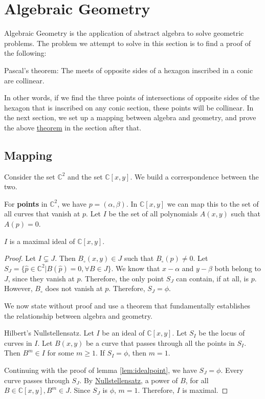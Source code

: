 \section{Algebraic Geometry}
Algebraic Geometry is the application of abstract algebra to solve geometric problems.
The problem we attempt to solve in this section is to find a proof of the following:
\begin{theorem} \label{theorem:pascals}
  Pascal's theorem: The meets of opposite sides of a hexagon inscribed in a conic are collinear.
\end{theorem}
In other words, if we find the three points of intersections of opposite sides of the hexagon that is inscribed on any conic section, these points will be collinear.
In the next section, we set up a mapping between algebra and geometry, and prove the above \hyperref[theorem:pascals]{theorem} in the section after that.

\subsection{Mapping}
Consider the set $\mathbb{C}^{2}$ and the set $\mathbb{C}[x, y]$.
We build a correspondence between the two.
\par
For \textbf{points} in $\mathbb{C}^{2}$, we have $p = ( \alpha, \beta )$.
In $\mathbb{C}[x, y]$ we can map this to the set of all curves that vanish at $p$.
Let $I$ be the set of all polynomials $A(x, y)$ such that $A(p) = 0$.
\begin{lemma} \label{lem:idealpoint}
  $I$ is a maximal ideal of $\mathbb{C}[x, y]$.
\end{lemma}
\begin{proof} \label{proof:idealpoint}
  Let $I \subsetneq J$.
  Then $B_{\circ}(x, y) \in J$ such that $B_{\circ}(p) \neq 0$.
  Let $S_{J} = \{ \widehat{p} \in \mathbb{C}^{2} | B(\widehat{p}) = 0, \forall B \in J \}$.
  We know that $x - \alpha$ and $y - \beta$ both belong to $J$, since they vanish at $p$.
  Therefore, the only point $S_{J}$ can contain, if at all, is $p$.
  However, $B_{\circ}$ does not vanish at $p$.
  Therefore, $S_{J} = \phi$.
  \par
  We now state without proof and use a theorem that fundamentally establishes the relationship between algebra and geometry.
  \par
  \begin{theorem} \label{theorem:nullstellensatz}
    Hilbert's Nullstellensatz.
    Let $I$ be an ideal of $\mathbb{C}[x, y]$.
    Let $S_{I}$ be the locus of curves in $I$.
    Let $B(x, y)$ be a curve that passes through all the points in $S_{I}$.
    Then $B^{m} \in I$ for some $m \geq 1$.
    If $S_{I} = \phi$, then $m = 1$.
  \end{theorem}
  Continuing with the proof of lemma \ref{lem:idealpoint}, we have $S_{J} = \phi$.
  Every curve passes through $S_{J}$.
  By \hyperref[theorem:nullstellensatz]{Nullstellensatz}, a power of $B$, for all $B \in \mathbb{C}[x ,y], B^{m} \in J$.
  Since $S_{J}$ is $\phi$, $m = 1$.
  Therefore, $I$ is maximal.
\end{proof}

